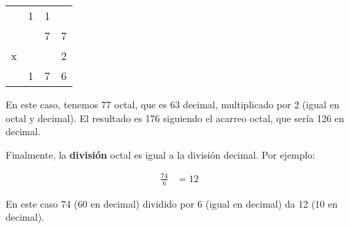 \begin{tabular}{cccc}
	  & 1 & 1 &   \\
	  &   & 7 & 7 \\
	x &   &   & 2 \\
\hline
	  & 1 & 7 & 6 \\
\end{tabular}

En este caso, tenemos 77 octal, que es 63 decimal, multiplicado por 2 (igual en octal y decimal). El resultado es 176 siguiendo el acarreo octal, que sería 126 en decimal.

Finalmente, la \textbf{división} octal es igual a la división decimal. Por ejemplo:

\begin{align*}
	\frac{74}{6} &= 12
\end{align*}

En este caso 74 (60 en decimal) dividido por 6 (igual en decimal) da 12 (10 en decimal).
